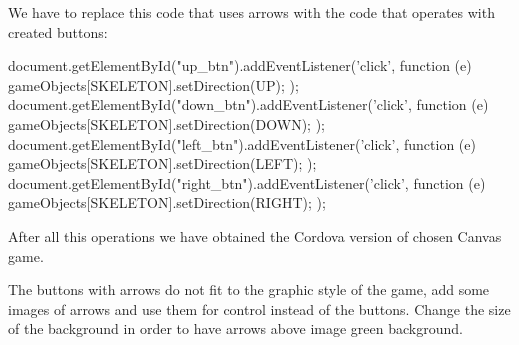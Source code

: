 We have to replace this code that uses arrows with the code that operates with created buttons:

\begin{js}
document.getElementById("up_btn").addEventListener('click', function (e){
		gameObjects[SKELETON].setDirection(UP);
	});
document.getElementById("down_btn").addEventListener('click', function (e){
		gameObjects[SKELETON].setDirection(DOWN);
	});
document.getElementById("left_btn").addEventListener('click', function (e){
		gameObjects[SKELETON].setDirection(LEFT);
	});
document.getElementById("right_btn").addEventListener('click', function (e){
		gameObjects[SKELETON].setDirection(RIGHT);
	});
\end{js}

After all this operations we have obtained the Cordova version of chosen Canvas game.

\begin{extercises}
  The buttons with arrows do not fit to the graphic style of the game, add some images of arrows and use them for control instead of the buttons.
  Change the size of the background in order to have arrows above image green background.
\end{extercises}




